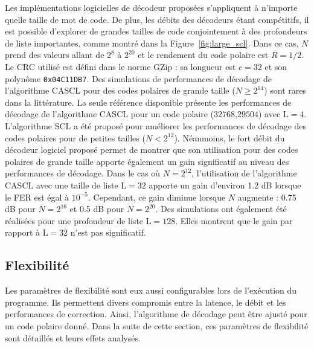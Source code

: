 Les implémentations logicielles de décodeur proposées s'appliquent à n'importe quelle taille de mot de code. De plus, les débits des décodeurs étant compétitifs, il est possible d'explorer de grandes tailles de code conjointement à des profondeurs de liste importantes, comme montré dans la Figure~\ref{fig:large_scl}. Dans ce cas, $N$ prend des valeurs allant de $2^8$ à $2^{20}$ et le rendement du code polaire est $R=1/2$. Le CRC utilisé est défini dans le norme GZip : sa longueur est $c=32$ et son polynôme \texttt{0x04C11DB7}. 
Des simulations de performances de décodage de l'algorithme CASCL pour des codes polaires de grande taille ($N \geq 2^{14}$) sont rares dans la littérature. La seule référence disponible présente les performances de décodage de l'algorithme CASCL pour un code polaire ($32768$,$29504$) avec $\mathrm{L}=4$.
L'algorithme SCL a été proposé pour améliorer les performances de décodage des codes polaires pour de petites tailles ($N<2^{12}$). Néanmoins, le fort débit du décodeur logiciel proposé permet de montrer que son utilisation pour des codes polaires de grande taille apporte également un gain significatif au niveau des performances de décodage. Dans le cas où $N=2^{12}$, l'utilisation de l'algorithme CASCL avec une taille de liste $\mathrm{L}=32$ apporte un gain d'environ 1.2 dB lorsque le FER est égal à $10^{-5}$. Cependant, ce gain diminue lorsque $N$ augmente : 0.75 dB pour $N=2^{16}$ et 0.5 dB pour $N=2^{20}$. Des simulations ont également été réalisées pour une profondeur de liste $\mathrm{L}=128$. Elles montrent que le gain par rapport à $\mathrm{L}=32$ n'est pas significatif.

\subsection{Flexibilité}
Les paramètres de flexibilité sont eux aussi configurables lors de l'exécution du programme. Ils permettent divers compromis entre la latence, le débit et les performances de correction. Ainsi, l'algorithme de décodage peut être ajusté pour un code polaire donné. Dans la suite de cette section, ces paramètres de flexibilité sont détaillés et leurs effets analysés.

